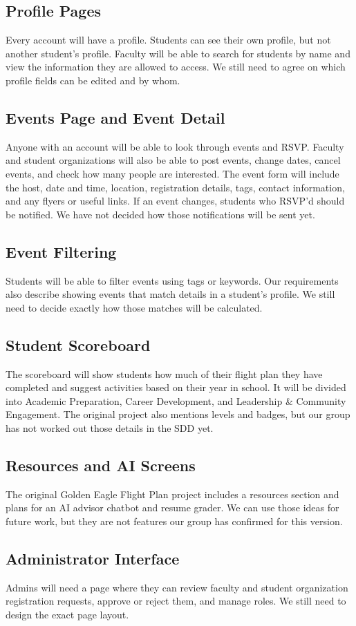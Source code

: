 \documentclass[11pt,letterpaper]{article}
\begin{document}
\subsection{Profile Pages}
Every account will have a profile. Students can see their own profile, but not another student's profile. Faculty will be able to search for students by name and view the information they are allowed to access. We still need to agree on which profile fields can be edited and by whom.
\subsection{Events Page and Event Detail}
Anyone with an account will be able to look through events and RSVP. Faculty and student organizations will also be able to post events, change dates, cancel events, and check how many people are interested. The event form will include the host, date and time, location, registration details, tags, contact information, and any flyers or useful links. If an event changes, students who RSVP'd should be notified. We have not decided how those notifications will be sent yet.
\subsection{Event Filtering}
Students will be able to filter events using tags or keywords. Our requirements also describe showing events that match details in a student's profile. We still need to decide exactly how those matches will be calculated.
\subsection{Student Scoreboard}
The scoreboard will show students how much of their flight plan they have completed and suggest activities based on their year in school. It will be divided into Academic Preparation, Career Development, and Leadership \& Community Engagement. The original project also mentions levels and badges, but our group has not worked out those details in the SDD yet.
\subsection{Resources and AI Screens}
The original Golden Eagle Flight Plan project includes a resources section and plans for an AI advisor chatbot and resume grader. We can use those ideas for future work, but they are not features our group has confirmed for this version.
\subsection{Administrator Interface}
Admins will need a page where they can review faculty and student organization registration requests, approve or reject them, and manage roles. We still need to design the exact page layout.
\end{document}
